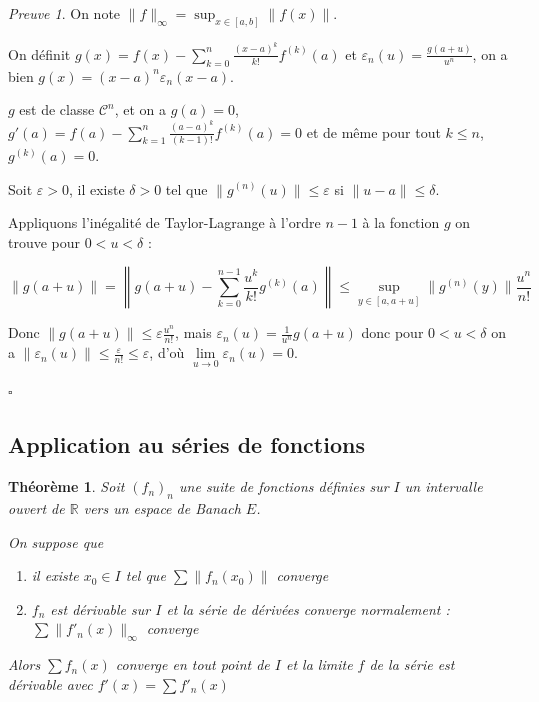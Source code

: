 \documentclass[]{article}
\newtheorem{mythm}{Théorème}
\theoremstyle{remark}
\newtheorem{myproof}{Preuve}
\theoremstyle{definition}
\newcommand{\cqfd}{
	\hfill$\square$
}
\begin{document}
\begin{myproof}
	On note $\|f\|_{\infty} = \displaystyle \sup_{x \in [a, b]} \|f(x)\|$.

	On définit $\displaystyle g(x) = f(x) - \sum_{k = 0}^{n} \frac{(x-a)^k}{k!} f^{(k)}(a)$ et $\varepsilon_n(u) = \frac{g(a+u)}{u^n}$, on a bien $g(x) = (x-a)^n \varepsilon_n(x - a)$.
	
	$g$ est de classe $\mathcal{C}^n$, et on a $g(a) = 0$, $\displaystyle g'(a) = f(a) - \sum_{k = 1}^{n} \frac{(a-a)^k}{(k-1)!}f^{(k)}(a) = 0$ et de même pour tout $k \leqslant n$, $g^{(k)}(a) = 0$.
	
	Soit $\varepsilon > 0$, il existe $\delta > 0$ tel que $\|g^{(n)}(u)\| \leqslant \varepsilon$ si $\|u - a\| \leqslant \delta$.
	
	Appliquons l'inégalité de Taylor-Lagrange à l'ordre $n-1$ à la fonction $g$ on trouve pour $0 < u < \delta$ : 
	
	$$\|g(a+u)\| = \left\|g(a+u) - \sum_{k = 0}^{n-1} \frac{u^k}{k!} g^{(k)}(a)\right\| \leqslant \sup_{y \in [a, a+u]} \|g^{(n)}(y)\| \frac{u^n}{n!}$$
	
	Donc $\|g(a+u)\| \leqslant \varepsilon \frac{u^n}{n!}$, mais $\varepsilon_n(u) = \frac{1}{u^n} g(a+u)$ donc pour $0 < u< \delta$ on a $\|\varepsilon_n(u)\| \leqslant \frac{\varepsilon}{n!} \leqslant \varepsilon$, d'où $\lim\limits_{u \to 0} \varepsilon_n(u) = 0$.
	
	\cqfd
\end{myproof}

\subsection{Application au séries de fonctions}

\begin{mythm}
	Soit $(f_n)_n$ une suite de fonctions définies sur $I$ un intervalle ouvert de $\mathbb{R}$ vers un espace de Banach $E$.
	
	On suppose que
	\begin{enumerate}
		\item il existe $x_0 \in I$ tel que $\sum \|f_n(x_0)\|$ converge
		\item $f_n$ est dérivable sur $I$ et la série de dérivées converge normalement : $\sum \|f'_n(x)\|_{\infty}$ converge
	\end{enumerate}
	
	Alors $\sum f_n(x)$ converge en tout point de $I$ et la limite $f$ de la série est dérivable avec $f'(x) = \sum f'_n(x)$
\end{mythm}
\end{document}
